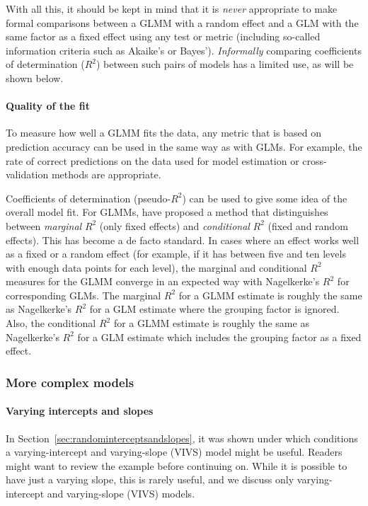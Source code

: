 With all this, it should be kept in mind that it is \textit{never} appropriate to make formal comparisons between a GLMM with a random effect and a GLM with the same factor as a fixed effect using any test or metric (including so-called information criteria such as Akaike's or Bayes').
\textit{Informally} comparing coefficients of determination ($R^2$) between such pairs of models has a limited use, as will be shown below.

\paragraph{Quality of the fit}

To measure how well a GLMM fits the data, any metric that is based on prediction accuracy can be used in the same way as with GLMs.
For example, the rate of correct predictions on the data used for model estimation or cross-validation methods are appropriate.

Coefficients of determination (pseudo-$R^2$) can be used to give some idea of the overall model fit.
For GLMMs, \citet{NakagawaSchielzeth2013} have proposed a method that distinguishes between \textit{marginal} $R^2$ (only fixed effects) and \textit{conditional} $R^2$ (fixed and random effects).
This has become a de facto standard.
In cases where an effect works well as a fixed or a random effect (for example, if it has between five and ten levels with enough data points for each level), the marginal and conditional $R^2$ measures for the GLMM converge in an expected way with Nagelkerke's $R^2$ for corresponding GLMs.
The marginal $R^2$ for a GLMM estimate is roughly the same as Nagelkerke's $R^2$ for a GLM estimate where the grouping factor is ignored.
Also, the conditional $R^2$ for a GLMM estimate is roughly the same as Nagelkerke's $R^2$ for a GLM estimate which includes the grouping factor as a fixed effect.


\subsubsection{More complex models}
\label{sec:morecomplexmodels}

\paragraph{Varying intercepts and slopes}

In Section~\ref{sec:randominterceptsandslopes}, it was shown under which conditions a varying-intercept and varying-slope (VIVS) model might be useful.
Readers might want to review the example before continuing on.
While it is possible to have just a varying slope, this is rarely useful, and we discuss only varying-intercept and varying-slope (VIVS) models.

